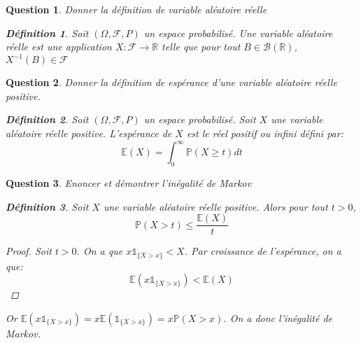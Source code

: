 \documentclass{article}
\theoremstyle{plain}
\newtheorem{question}{Question}
\theoremstyle{definition}
\newtheorem{definition}{Définition}
\begin{document}
\begin{question}
	Donner la définition de variable aléatoire réelle
	\begin{definition}
		Soit $(\Omega, \mathscr{F}, P)$ un espace probabilisé. Une variable aléatoire réelle est une application $X:\mathscr{F} \to \mathbb{R}$  telle que pour tout $B \in \mathscr{B} (\mathbb{R})$, $X^{-1} (B) \in \mathscr{F}$
	\end{definition}
\end{question}

\begin{question}
	Donner la définition de espérance d'une variable aléatoire réelle positive.
	\begin{definition}
		Soit $(\Omega, \mathscr{F}, P)$ un espace probabilisé. Soit $X$ une variable aléatoire réelle positive. L'espérance de $X$ est le réel positif ou infini défini par:
		\begin{equation*}
			\mathbb{E} (X) = \int_0^{\infty} \mathbb{P} (X \ge t) dt
		\end{equation*}
	\end{definition}
\end{question}

\begin{question}
	Enoncer et démontrer l'inégalité de Markov
	\begin{definition}
		Soit $X$ une variable aléatoire réelle positive. Alors pour tout $t > 0$,
		\begin{equation*}
			\mathbb{P} (X > t) \le \frac{\mathbb{E} (X)}{t}
		\end{equation*}
		\begin{proof}
			Soit $t > 0$. On a que $x\mathds{1}_{\{X > x\}} < X$. Par croissance de l'espérance, on a que:
			\begin{equation*}
				\mathbb{E} (x\mathds{1}_{\{X > x\}}) < \mathbb{E} (X)
			\end{equation*}
		\end{proof}
		Or $\mathbb{E} (x\mathds{1}_{\{X > x\}}) = x\mathbb{E} (\mathds{1}_{\{X > x\}}) = x\mathbb{P} (X > x)$.
		On a donc l'inégalité de Markov.

	\end{definition}
\end{question}
\end{document}
